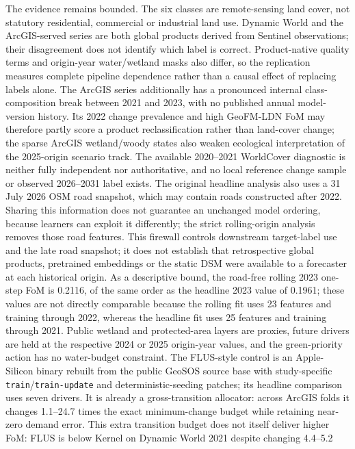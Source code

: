 The evidence remains bounded. The six classes are remote-sensing land
cover, not statutory residential, commercial or industrial land use.
Dynamic World and the ArcGIS-served series are both global products
derived from Sentinel observations; their disagreement does not identify
which label is correct. Product-native quality terms and origin-year
water/wetland masks also differ, so the replication measures complete
pipeline dependence rather than a causal effect of replacing labels
alone. The ArcGIS series additionally has a pronounced internal
class-composition break between 2021 and 2023, with no published annual
model-version history. Its 2022 change prevalence and high GeoFM-LDN FoM
may therefore partly score a product reclassification rather than
land-cover change; the sparse ArcGIS wetland/woody states also weaken
ecological interpretation of the 2025-origin scenario track. The
available 2020--2021 WorldCover diagnostic is neither fully independent
nor authoritative, and no local reference change sample or observed
2026--2031 label exists. The original headline analysis also uses a 31
July 2026 OSM road snapshot, which may contain roads constructed after
2022. Sharing this information does not guarantee an unchanged model
ordering, because learners can exploit it differently; the strict
rolling-origin analysis removes those road features. This firewall
controls downstream target-label use and the late road snapshot; it does
not establish that retrospective global products, pretrained embeddings
or the static DSM were available to a forecaster at each historical
origin. As a descriptive bound, the road-free rolling 2023 one-step FoM
is 0.2116, of the same order as the headline 2023 value of 0.1961; these
values are not directly comparable because the rolling fit uses 23
features and training through 2022, whereas the headline fit uses 25
features and training through 2021. Public wetland and protected-area
layers are proxies, future drivers are held at the respective 2024 or
2025 origin-year values, and the green-priority action has no
water-budget constraint. The FLUS-style control is an Apple-Silicon
binary rebuilt from the public GeoSOS source base with study-specific
\texttt{train}/\texttt{train-update} and deterministic-seeding patches;
its headline comparison uses seven drivers. It is already a
gross-transition allocator: across ArcGIS folds it changes 1.1--24.7
times the exact minimum-change budget while retaining near-zero demand
error. This extra transition budget does not itself deliver higher FoM:
FLUS is below Kernel on Dynamic World 2021 despite changing 4.4--5.2

